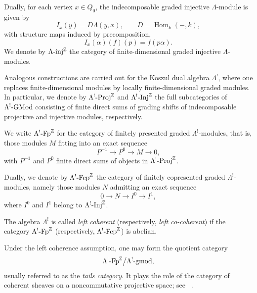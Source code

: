 \documentclass[11pt]{article}
\theoremstyle{definition}
\theoremstyle{remark}
\begin{document}
\medskip

Dually, for each vertex \(x\in Q_{0}\), the indecomposable graded injective \(\Lambda\)-module is given by
\[
I_{x}(y)=D\Lambda(y,x),
\qquad D=\operatorname{Hom}_{k}(-,k),
\]
with structure maps induced by precomposition,
\[
I_{x}(\alpha)(f)(p)=f(p\alpha).
\]
We denote by \(\Lambda\textup{-inj}^{\mathbb{Z}}\) the category of finite-dimensional graded injective \(\Lambda\)-modules.

\medskip

\medskip

Analogous constructions are carried out for the Koszul dual algebra \(\Lambda^{!}\), where one replaces finite-dimensional modules by locally finite-dimensional graded modules. In particular, we denote by
\( 
\Lambda^{!}\textup{-Proj}^{\mathbb{Z}}
\)
and \( 
\Lambda^{!}\textup{-Inj}^{\mathbb{Z}}
\)
the full subcategories of \(\Lambda^{!}\textup{-GMod}\) consisting of finite direct sums of grading shifts of indecomposable projective and injective modules, respectively.

\medskip

We write \(\Lambda^{!}\textup{-Fp}^{\mathbb{Z}}\) for the category of finitely presented graded \(\Lambda^{!}\)-modules, that is, those modules \(M\) fitting into an exact sequence
\[
P^{-1} \longrightarrow P^{0} \longrightarrow M \longrightarrow 0,
\]
with \(P^{-1}\) and \(P^{0}\) finite direct sums of objects in \(\Lambda^{!}\textup{-Proj}^{\mathbb{Z}}\).

Dually, we denote by \(\Lambda^{!}\textup{-Fcp}^{\mathbb{Z}}\) the category of finitely copresented graded \(\Lambda^{!}\)-modules, namely those modules \(N\) admitting an exact sequence
\[
0 \longrightarrow N \longrightarrow I^{0} \longrightarrow I^{1},
\]
where \(I^{0}\) and \(I^{1}\) belong to \(\Lambda^{!}\textup{-Inj}^{\mathbb{Z}}\).

\medskip

The algebra \(\Lambda^{!}\) is called \emph{left coherent} (respectively,
\emph{left co-coherent}) if the category
\(\Lambda^{!}\textup{-}\mathrm{Fp}^{\mathbb{Z}}\)
(respectively,
\(\Lambda^{!}\textup{-}\mathrm{Fcp}^{\mathbb{Z}}\))
is abelian.

Under the left coherence assumption, one may form the quotient category
\[
\Lambda^{!}\textup{-}\mathrm{Fp}^{\mathbb{Z}}
\big/
\Lambda^{!}\textup{-}\mathrm{gmod},
\]
usually referred to as the \emph{tails category}. It plays the role of the
category of coherent sheaves on a noncommutative projective space; see
~\cite{2,22,23}.
\end{document}
